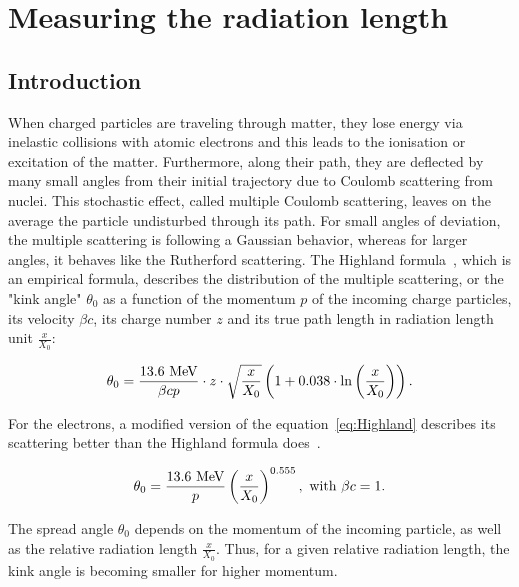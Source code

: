   \section{Measuring the radiation length}

    \subsection{Introduction}
    
    When charged particles are traveling through matter, they lose energy via inelastic collisions with atomic electrons and this leads to the ionisation or excitation of the matter.
    Furthermore, along their path, they are deflected by many small angles from their initial trajectory due to Coulomb scattering from nuclei. 
    This stochastic effect, called multiple Coulomb scattering, leaves on the average the particle undisturbed through its path. 
    For small angles of deviation, the multiple scattering is following a Gaussian behavior, whereas for larger angles, it behaves like the Rutherford scattering.
    The Highland formula~\cite{Highland:1975pq}, which is an empirical formula, describes the distribution of the multiple scattering, or the "kink angle" $\theta_0$ as a function of the momentum $p$ of the incoming charge particles, its velocity $\beta c$, its charge number $z$ and its true path length in radiation length unit $\frac{x}{X_{0}}$:

    \begin{equation}
      \theta_{0} = \frac{13.6~\rm{MeV}}{\beta c p}\cdot z \cdot \sqrt{\frac{x}{X_{0}}}\left(1 + 0.038 \cdot \ln{\left(\frac{x}{X_{0}}\right)}\right).
      \label{eq:Highland}
    \end{equation}

    For the electrons, a modified version of the equation~\ref{eq:Highland} describes its scattering better than the Highland formula does~\cite{GEANT4}.

    \begin{equation}
      \theta_{0} = \frac{13.6~\rm{MeV}}{p}\left(\frac{x}{X_{0}}\right)^{0.555},~\text{with $\beta c = 1$.}
      \label{eq:theta0}
    \end{equation}

    The spread angle $\theta_{0}$ depends on the momentum of the incoming particle, as well as the relative radiation length $\frac{x}{X_{0}}$.
    Thus, for a given relative radiation length, the kink angle is becoming smaller for higher momentum.

